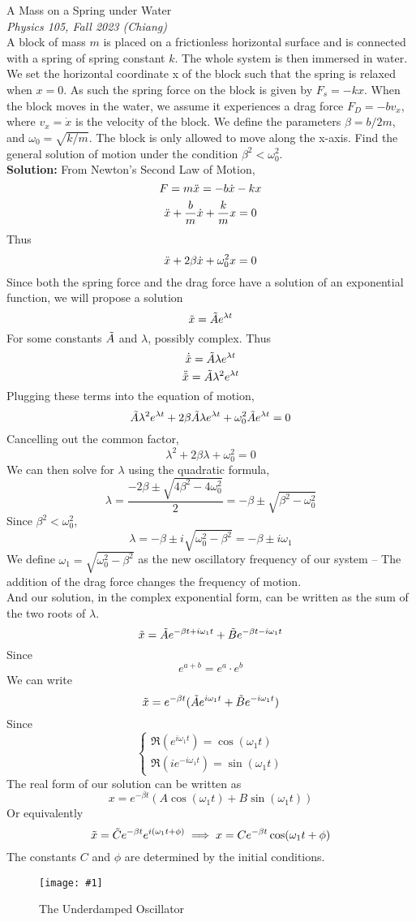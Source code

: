 \documentclass[11pt]{article}
\newcommand{\fig}[4]{
    \begin{figure}[H]
        \centering
        \texttt{[image: \#1]}
        \caption{#2}
        \label{exp4fit}
    \end{figure}
}
\theoremstyle{gangnamstyle}{\newtheorem{definition}{Definition}[]}
\theoremstyle{gangnamstyle}{\newtheorem{example}{Example}[]}
\theoremstyle{gangnamstyle}{\newtheorem{problem}{Problem}[]}
\theoremstyle{gangnamstyle}{\newtheorem{warning}{Warning}[]}
\begin{document}
\begin{example}
A Mass on a Spring under Water \\
\textit{Physics 105, Fall 2023 (Chiang)} \\
A block of mass $m$ is placed on a frictionless horizontal surface and is connected with a spring of spring constant $k$. The whole system is then immersed in water. We set the horizontal coordinate x of the block such that the spring is relaxed when $x = 0$. As such the spring force on the block is given by $F_s = -kx$. When the block moves in the water, we assume it experiences a drag force $F_D = -bv_x$, where $v_x = \Dot{x}$ is the velocity of the block. We define the parameters $\beta = b/2m$, and $\omega_0 = \sqrt{k / m}$. The block is only allowed to move along the x-axis. Find the general solution of motion under the condition $\beta^2 < \omega_0^2$. \\

\textbf{Solution:} From Newton's Second Law of Motion, 
\[ F = m\Ddot{x} = -b\Dot{x} - kx \]
\[ \Ddot{x} + \frac{b}{m}\Dot{x} + \frac{k}{m}x = 0 \]
Thus 
\[ \Ddot{x} + 2\beta\Dot{x} + \omega_0^2x = 0 \]
Since both the spring force and the drag force have a solution of an exponential function, we will propose a solution
\[ \Tilde{x} = \Tilde{A}e^{\lambda t} \]
For some constants $\Tilde{A}$ and $\lambda$, possibly complex. Thus
\[ \Dot{\Tilde{x}} = \Tilde{A}\lambda e^{\lambda t} \]
\[ \Ddot{\Tilde{x}} = \Tilde{A}\lambda^2 e^{\lambda t} \]
Plugging these terms into the equation of motion, 
\[ \Tilde{A}\lambda^2 e^{\lambda t} + 2\beta \Tilde{A}\lambda e^{\lambda t} + \omega_0^2 \Tilde{A}e^{\lambda t} = 0 \]
Cancelling out the common factor, 
\[ \lambda^2 + 2\beta\lambda + \omega_0^2 = 0 \]
We can then solve for $\lambda$ using the quadratic formula,
\[ \lambda = \frac{-2\beta \pm \sqrt{4\beta^2 - 4\omega_0^2}}{2} = -\beta \pm \sqrt{\beta^2 - \omega_0^2} \]
Since $\beta^2 < \omega_0^2$, 
\[ \lambda = -\beta \pm i \sqrt{\omega_0^2 - \beta^2} = -\beta \pm i \omega_1 \]
We define $\omega_1 = \sqrt{\omega_0^2 - \beta^2}$ as the new oscillatory frequency of our system -- The addition of the drag force changes the frequency of motion. \\
And our solution, in the complex exponential form, can be written as the sum of the two roots of $\lambda$. 
\[ \Tilde{x} = \Tilde{A}e^{-\beta t +i\omega_1t} + \Tilde{B}e^{-\beta t -i\omega_1t} \]
Since 
\[ e^{a + b} = e^a \cdot e^b \]
We can write
\[ \Tilde{x} = e^{-\beta t}(\Tilde{A}e^{i\omega_1 t} + \Tilde{B}e^{-i\omega_1 t}) \]
Since
\[ \begin{cases}
\Re(e^{i\omega_1 t}) = \cos(\omega_1 t) \\
\Re(ie^{-i\omega_1 t}) = \sin(\omega_1 t)
\end{cases} \]
The real form of our solution can be written as
\[ x = e^{-\beta t}(A\cos(\omega_1 t) + B\sin(\omega_1 t)) \]
Or equivalently
\[ \Tilde{x} = \Tilde{C}e^{-\beta t}e^{i(\omega_1t + \phi)} \implies x = Ce^{-\beta t}\cos(\omega_1 t + \phi) \]
The constants $C$ and $\phi$ are determined by the initial conditions. 

\fig{figs/n1/damp.jpg}{The Underdamped Oscillator}{0.6}{0}
\end{example}
\end{document}
